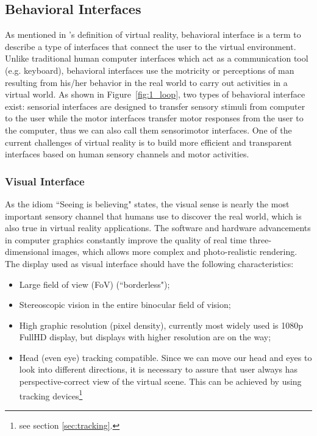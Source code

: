 \subsection{Behavioral Interfaces}
As mentioned in \citet{Fuchs2011Book}'s definition of virtual reality, behavioral interface is a term to describe a type of interfaces that connect the user to the virtual environment. Unlike traditional human computer interfaces which act as a communication tool (e.g. keyboard), behavioral interfaces use the motricity or perceptions of man resulting from his/her behavior in the real world to carry out activities in a virtual world. As shown in Figure~\ref{fig:1_loop}, two types of behavioral interface exist: sensorial interfaces are designed to transfer sensory stimuli from computer to the user while the motor interfaces transfer motor responses from the user to the computer, thus we can also call them sensorimotor interfaces. One of the current challenges of virtual reality is to build more efficient and transparent interfaces based on human sensory channels and motor activities.

\subsubsection{Visual Interface}
\label{sec:visual_interface}
As the idiom ``Seeing is believing" states, the visual sense is nearly the most important sensory channel that humans use to discover the real world, which is also true in virtual reality applications. The software and hardware advancements in computer graphics constantly improve the quality of real time three-dimensional images, which allows more complex and photo-realistic rendering. The display used as visual interface should have the following characteristics:

\begin{itemize}
\item Large field of view (FoV) (``borderless");
\item Stereoscopic vision in the entire binocular field of vision;
\item High graphic resolution (pixel density), currently most widely used is 1080p FullHD display, but displays with higher resolution are on the way;
\item Head (even eye) tracking compatible. Since we can move our head and eyes to look into different directions, it is necessary to assure that user always has perspective-correct view of the virtual scene. This can be achieved by using tracking devices\footnote{see section \ref{sec:tracking}.}
\end{itemize}

